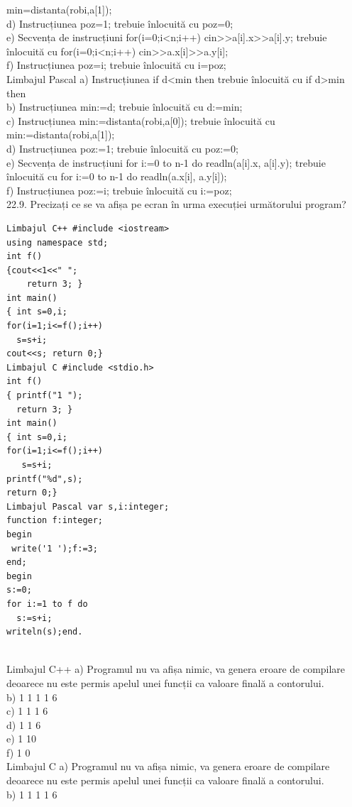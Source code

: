 {{min=distanta(robi,a[1]);    
\\
d) Instrucțiunea   poz=1;  trebuie înlocuită cu poz=0; 
\\
e) Secvența de instrucțiuni  
for(i=0;i<n;i++) cin>>a[i].x>>a[i].y;  
trebuie înlocuită cu  
for(i=0;i<n;i++) cin>>a.x[i]>>a.y[i]; 
\\
f) Instrucțiunea poz=i; trebuie înlocuită cu i=poz; 
\\
Limbajul Pascal 
a) Instrucțiunea if d<min then  trebuie înlocuită cu  if d>min then 
\\
b) Instrucțiunea   min:=d; trebuie înlocuită cu d:=min; 
\\
c) Instrucțiunea min:=distanta(robi,a[0]); trebuie înlocuită cu 
 min:=distanta(robi,a[1]); 
\\
d) Instrucțiunea   poz:=1;  trebuie înlocuită cu poz:=0; 
\\
e) Secvența de instrucțiuni  
for i:=0 to n-1 do readln(a[i].x, a[i].y);  
trebuie înlocuită cu 
 for i:=0 to n-1 do readln(a.x[i], a.y[i]); 
\\
f) Instrucțiunea  poz:=i; trebuie înlocuită cu i:=poz;
\\
22.9. Precizați ce se va afișa pe ecran în urma execuției următorului program?
\begin{verbatim}
Limbajul C++ #include <iostream> 
using namespace std; 
int f() 
{cout<<1<<" ";  
    return 3; } 
int main() 
{ int s=0,i; 
for(i=1;i<=f();i++)
  s=s+i; 
cout<<s; return 0;}
Limbajul C #include <stdio.h> 
int f() 
{ printf("1 "); 
  return 3; } 
int main() 
{ int s=0,i;  
for(i=1;i<=f();i++) 
   s=s+i;
printf("%d",s); 
return 0;}
Limbajul Pascal var s,i:integer; 
function f:integer; 
begin 
 write('1 ');f:=3; 
end; 
begin 
s:=0; 
for i:=1 to f do 
  s:=s+i; 
writeln(s);end.
\end{verbatim}
\\
Limbajul C++ 
a) Programul nu va afișa 
nimic, va genera 
eroare de compilare 
deoarece nu este 
permis apelul unei 
funcții ca valoare 
finală a contorului. 
\\
b) 1 1 1 1 6 
\\
c) 1 1 1 6 
\\
d) 1 1 6 
\\
e) 1 10 
\\
f) 1 0
\\
Limbajul C 
a) Programul nu va afișa 
nimic, va genera 
eroare de compilare 
deoarece nu este 
permis apelul unei 
funcții ca valoare 
finală a contorului. 
\\
b) 1 1 1 1 6 
\\
}}
